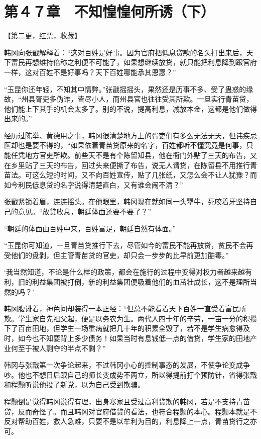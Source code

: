 \section{第４７章　不知惶惶何所诱（下）}

【第二更，红票，收藏】

韩冈向张戬解释着：“这对百姓是好事。因为官府把低息贷款的名头打出来后，天下富民再想维持倍称之利便不可能了，如果想继续放贷，就只能把利息降到跟官府一样，这对百姓不是好事吗？天下百姓哪能承其恩惠？”

“玉昆你还年轻，不知其中情弊。”张戬摇摇头，果然还是历事不多、受了蛊惑的缘故，“州县胥吏多伪诈，皆尽小人，而州县官也往往受其所欺。一旦实行青苗贷，他们能上下其手的机会太多了。别的不说，提高利息，减放本金，这都是他们做得出来的。”

经历过陈举、黄德用之事，韩冈很清楚地方上的胥吏们有多么无法无天，但讳疾忌医却也是要不得的，“如果依着青苗贷原来的名字，百姓都听不懂究竟是何事，只能任凭地方官吏所欺。前些天不是有个陈留知县，他在衙门外贴了三天的布告，又在乡里贴了三天的布告，回过头来便撕了布告，说无人请贷，在陈留县不用推行青苗法。可这么短的时间，又不向百姓宣传，贴了几张纸，又怎么会不让人犹豫？而如今利民低息贷的名字说得清楚直白，又有谁会闹不清？”

张戬紧锁着眉，连连摇头。在他眼里，韩冈现在就如同一头犟牛，死咬着牙坚持自己的意见。“放贷收息，朝廷体面还要不要了？”

“朝廷的体面由百姓中来，百姓富足，朝廷自然有体面。”

“玉昆你可知道，一旦青苗贷推行下去，尽管如今的富民不能再放贷，贫民不会再受他们的盘剥，但主管青苗贷的官吏，却只会一步步的比早前更加酷毒。”

‘我当然知道，不论是什么样的政策，都会在施行的过程中变得对权力者越来越有利，旧的利益集团被打倒，新的利益集团便吸着他们的血茁壮成长，这不是理所当然的吗？’

韩冈腹诽着，神色间却装得一本正经：“但总不能看着天下百姓一直受着富民所欺。学生家自先祖父起，便是以务农为生。两代人四十年的辛劳，一亩一分的积攒下了百亩田地，但学生一场重病就把几十年的积累全毁了，若不是学生病愈得及时，如今也不知要背上多少债务！如果当时有息钱低一点的借贷，学生家的田地产业何至于被人剽夺的半点不剩？”

韩冈与张戬第一次争论起来，不过韩冈小心的控制事态的发展，不使争论变成争吵。他也不想日后跟自己的师长变成势不两立，所以得提前打个预防针，省得张戬和程颢听说他投了新党，以为自己受到欺骗。

程颢倒是觉得韩冈说得有理，出身寒家且受过高利贷欺的韩冈，若是不支持青苗贷，反而奇怪了。而且韩冈对官府借贷的看法，也符合程颢的本心。程颢本就是不反对帮助百姓，救人急难，只要不是以牟利为目的，利息降上一点，青苗贷行之亦可。

